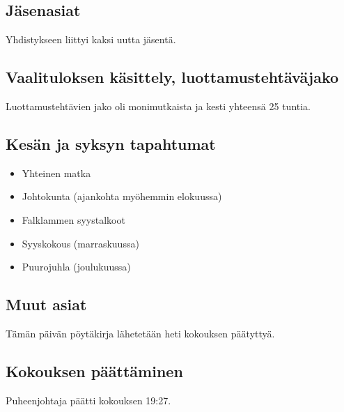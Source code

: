 \documentclass[a4paper,12pt]{article}
\begin{document}
\subsection{Jäsenasiat}
Yhdistykseen liittyi kaksi uutta jäsentä.
\subsection{Vaalituloksen käsittely, luottamustehtäväjako}
Luottamustehtävien jako oli monimutkaista ja kesti yhteensä 25 tuntia.
\subsection{Kesän ja syksyn tapahtumat}
\begin{itemize}
\item{Yhteinen matka }
\item{Johtokunta (ajankohta myöhemmin elokuussa)}
\item{Falklammen syystalkoot}
\item{Syyskokous (marraskuussa)}
\item{Puurojuhla (joulukuussa)}
\end{itemize}
\subsection{Muut asiat}
Tämän päivän pöytäkirja lähetetään heti kokouksen päätyttyä.
\subsection{Kokouksen päättäminen}
Puheenjohtaja päätti kokouksen 19:27.
\end{document}
